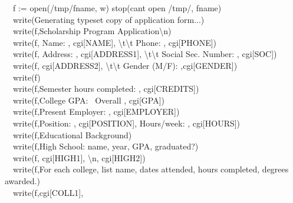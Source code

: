 {\ \ f :=
open({\textquotedbl}/tmp/{\textquotedbl}{\textbar}{\textbar}fname,
{\textquotedbl}w{\textquotedbl}) {\textbar}
stop({\textquotedbl}can{\textquotesingle}t open /tmp/{\textquotedbl},
fname) \\
\ \ write({\textquotedbl}Generating typeset copy of application
form...{\textquotedbl}) \\
\ \ write(f,{\textquotedbl}Scholarship Program
Application{\textbackslash}n{\textquotedbl}) \\
\ \ write(f, {\textquotedbl}Name: {\textquotedbl},
cgi[{\textquotedbl}NAME{\textquotedbl}],
{\textquotedbl}{\textbackslash}t{\textbackslash}t Phone:
{\textquotedbl}, cgi[{\textquotedbl}PHONE{\textquotedbl}]) \\
\ \ write(f, {\textquotedbl}Address: {\textquotedbl},
cgi[{\textquotedbl}ADDRESS1{\textquotedbl}], {\textquotedbl}
{\textbackslash}t{\textbackslash}t Social Sec. Number: {\textquotedbl},
cgi[{\textquotedbl}SOC{\textquotedbl}]) \\
\ \ write(f, cgi[{\textquotedbl}ADDRESS2{\textquotedbl}],
{\textquotedbl} {\textbackslash}t{\textbackslash}t Gender (M/F):
{\textquotedbl},cgi[{\textquotedbl}GENDER{\textquotedbl}]) \\
\ \ write(f) \\
\ \ write(f,{\textquotedbl}Semester hours completed: {\textquotedbl},
cgi[{\textquotedbl}CREDITS{\textquotedbl}]) \\
\ \ write(f,{\textquotedbl}College GPA: \ Overall {\textquotedbl},
cgi[{\textquotedbl}GPA{\textquotedbl}]) \\
\ \ write(f,{\textquotedbl}Present Employer: {\textquotedbl},
cgi[{\textquotedbl}EMPLOYER{\textquotedbl}]) \\
\ \ write(f,{\textquotedbl}Position: {\textquotedbl},
cgi[{\textquotedbl}POSITION{\textquotedbl}], {\textquotedbl}
Hours/week: {\textquotedbl}, cgi[{\textquotedbl}HOURS{\textquotedbl}]) \\
\ \ write(f,{\textquotedbl}Educational Background{\textquotedbl}) \\
\ \ write(f,{\textquotedbl}High School: name, year, GPA,
		graduated?{\textquotedbl}) \\
\ \ write(f, cgi[{\textquotedbl}HIGH1{\textquotedbl}],
{\textquotedbl}{\textbackslash}n{\textquotedbl},
cgi[{\textquotedbl}HIGH2{\textquotedbl}]) \\
\ \ write(f,{\textquotedbl}For each college, list name, dates attended,
hours completed, degrees awarded.{\textquotedbl}) \\
\ \ write(f,cgi[{\textquotedbl}COLL1{\textquotedbl}],
}
